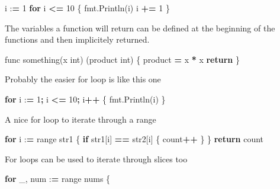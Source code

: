 \documentclass[]{book}
\newenvironment{Shaded}{\begin{snugshade}}{\end{snugshade}}
\newcommand{\DecValTok}[1]{\textcolor[rgb]{0.00,0.00,0.81}{#1}}
\newcommand{\ControlFlowTok}[1]{\textcolor[rgb]{0.13,0.29,0.53}{\textbf{#1}}}
\newcommand{\OperatorTok}[1]{\textcolor[rgb]{0.81,0.36,0.00}{\textbf{#1}}}
\newcommand{\BuiltInTok}[1]{#1}
\newcommand{\NormalTok}[1]{#1}
\begin{document}
\begin{Shaded}
\begin{Highlighting}[]
\NormalTok{i :}\OperatorTok{=} \DecValTok{1}
\ControlFlowTok{for}\NormalTok{ i }\OperatorTok{<=} \DecValTok{10}\NormalTok{ \{}
\NormalTok{    fmt.Println(i)}
\NormalTok{    i }\OperatorTok{+=} \DecValTok{1}
\NormalTok{\}}
\end{Highlighting}
\end{Shaded}

The variables a function will return can be defined at the beginning of
the functions and then implicitely returned.

\begin{Shaded}
\begin{Highlighting}[]
\NormalTok{func something(x }\BuiltInTok{int}\NormalTok{) (product }\BuiltInTok{int}\NormalTok{) \{}
\NormalTok{    product }\OperatorTok{=}\NormalTok{ x }\OperatorTok{*}\NormalTok{ x}
    \ControlFlowTok{return}
\NormalTok{\}}
\end{Highlighting}
\end{Shaded}

Probably the easier for loop is like this one

\begin{Shaded}
\begin{Highlighting}[]
\ControlFlowTok{for}\NormalTok{ i :}\OperatorTok{=} \DecValTok{1}\OperatorTok{;}\NormalTok{ i }\OperatorTok{<=} \DecValTok{10}\OperatorTok{;}\NormalTok{ i}\OperatorTok{++}\NormalTok{ \{}
\NormalTok{    fmt.Println(i)}
\NormalTok{\}}
\end{Highlighting}
\end{Shaded}

A nice for loop to iterate through a range

\begin{Shaded}
\begin{Highlighting}[]
\ControlFlowTok{for}\NormalTok{ i :}\OperatorTok{=} \BuiltInTok{range}\NormalTok{ str1 \{}
    \ControlFlowTok{if}\NormalTok{ str1[i] }\OperatorTok{==}\NormalTok{ str2[i] \{ count}\OperatorTok{++}\NormalTok{ \}}
\NormalTok{\}}
\ControlFlowTok{return}\NormalTok{ count}
\end{Highlighting}
\end{Shaded}

For loops can be used to iterate through slices too

\begin{Shaded}
\begin{Highlighting}[]
\ControlFlowTok{for}\NormalTok{ _, num :}\OperatorTok{=} \BuiltInTok{range}\NormalTok{ nums \{}
\end{Highlighting}
\end{Shaded}
\end{document}
